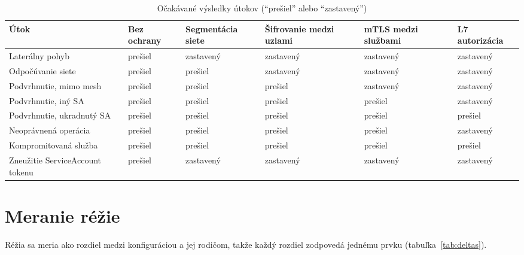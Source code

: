 \begin{table}[ht!]
  \centering
  \caption{Očakávané výsledky útokov (\enquote{prešiel} alebo \enquote{zastavený})}
  \label{tab:expected}
  \footnotesize
  \renewcommand{\arraystretch}{1.15}
  \begin{tabularx}{\textwidth}{@{}>{\raggedright\arraybackslash}X>{\centering\arraybackslash}p{1.65cm}>{\centering\arraybackslash}p{1.65cm}>{\centering\arraybackslash}p{1.65cm}>{\centering\arraybackslash}p{1.65cm}>{\centering\arraybackslash}p{1.65cm}@{}}
    \toprule
    Útok & Bez ochrany & Segmen\-tácia siete & Šifrovanie medzi uzlami & mTLS medzi službami & L7 autori\-zácia \\
    \midrule
    Laterálny pohyb & prešiel & zastavený & zastavený & zastavený & zastavený \\
    Odpočúvanie siete & prešiel & prešiel & zastavený & zastavený & zastavený \\
    Podvrhnutie, mimo mesh & prešiel & prešiel & prešiel & zastavený & zastavený \\
    Podvrhnutie, iný SA & prešiel & prešiel & prešiel & prešiel & zastavený \\
    Podvrhnutie, ukradnutý SA & prešiel & prešiel & prešiel & prešiel & prešiel \\
    Neoprávnená operácia & prešiel & prešiel & prešiel & prešiel & zastavený \\
    Kompromitovaná služba & prešiel & prešiel & prešiel & prešiel & prešiel \\
    Zneužitie ServiceAccount tokenu & prešiel & zastavený & zastavený & zastavený & zastavený \\
    \bottomrule
  \end{tabularx}
\end{table}

\section{Meranie réžie}
\label{sec:measurement-design}

Réžia sa meria ako rozdiel medzi konfiguráciou a jej rodičom, takže každý rozdiel zodpovedá jednému prvku (tabuľka~\ref{tab:deltas}).


